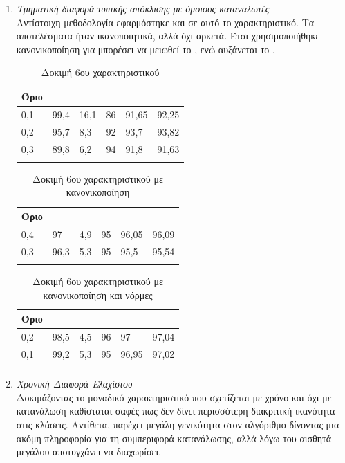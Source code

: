 \begin{enumerate}
\item{\textit{Τμηματική διαφορά τυπικής απόκλισης με όμοιους καταναλωτές}} \\
Αντίστοιχη μεθοδολογία εφαρμόστηκε και σε αυτό το χαρακτηριστικό. Τα αποτελέσματα ήταν ικανοποιητικά, αλλά όχι αρκετά. Έτσι χρησιμοποιήθηκε κανονικοποίηση για μπορέσει να μειωθεί το , ενώ αυξάνεται το .
\begin{center}
\begin{longtabu} to 0.8\textwidth { | X[c] || X[c] | X[c] | X[c] | X[c] | X[c] |  }
 \hline
  Όριο &   &  &  &  & \\
 ,1&	99,4&	16,1&	86&	91,65&	92,25\\
0,2&	95,7&	8,3&	92&	93,7&	93,82\\
0,3&	89,8&	6,2&	94&	91,8&	91,63\\
\hline
\caption{Δοκιμή 6ου χαρακτηριστικού}
\label{testfeat6}
\end{longtabu}
\end{center}

\begin{center}
\begin{longtabu} to 0.8\textwidth { | X[c] || X[c] | X[c] | X[c] | X[c] | X[c] |  }
 \hline
  Όριο &   &  &  &  & \\
 ,4&	97&	4,9&	95&	96,05&	96,09\\
0,3	&96,3&	5,3&	95&	95,5&	95,54\\
\hline
\caption{Δοκιμή 6ου χαρακτηριστικού με κανονικοποίηση}
\label{testfeat6normalized}
\end{longtabu}
\end{center}

\begin{center}
\begin{longtabu} to 0.8\textwidth { | X[c] || X[c] | X[c] | X[c] | X[c] | X[c] |  }
 \hline
  Όριο &   &  &  &  & \\
 ,2&	98,5&	4,5&	96&	97&	97,04\\
0,1&	99,2&	5,3&	95&	96,95&	97,02\\
\hline
\caption{Δοκιμή 6ου χαρακτηριστικού με κανονικοποίηση και νόρμες}
\label{testfeat6normalizednorms}
\end{longtabu}
\end{center}

\item{\textit{Χρονική Διαφορά Ελαχίστου}} \\
Δοκιμάζοντας το μοναδικό χαρακτηριστικό που σχετίζεται με χρόνο και όχι με κατανάλωση καθίσταται σαφές πως δεν δίνει περισσότερη διακριτική ικανότητα στις κλάσεις. Αντίθετα, παρέχει μεγάλη γενικότητα στον αλγόριθμο δίνοντας μια ακόμη πληροφορία για τη συμπεριφορά κατανάλωσης, αλλά λόγω του αισθητά μεγάλου  αποτυγχάνει να διαχωρίσει.


\end{enumerate}
